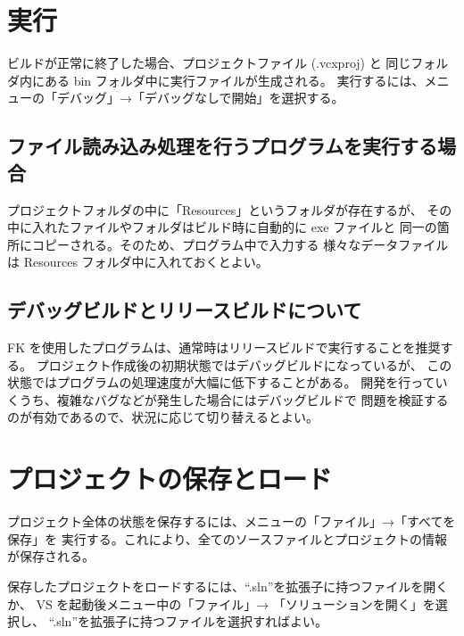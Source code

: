 \documentclass[a4j]{jarticle}
\begin{document}
\section{実行}
ビルドが正常に終了した場合、プロジェクトファイル (.vcxproj) と
同じフォルダ内にある bin フォルダ中に実行ファイルが生成される。
実行するには、メニューの「デバッグ」→「デバッグなしで開始」を選択する。

\subsection{ファイル読み込み処理を行うプログラムを実行する場合}
プロジェクトフォルダの中に「Resources」というフォルダが存在するが、
その中に入れたファイルやフォルダはビルド時に自動的に exe ファイルと
同一の箇所にコピーされる。そのため、プログラム中で入力する
様々なデータファイルは Resources フォルダ中に入れておくとよい。

\subsection{デバッグビルドとリリースビルドについて}
FK を使用したプログラムは、通常時はリリースビルドで実行することを推奨する。
プロジェクト作成後の初期状態ではデバッグビルドになっているが、
この状態ではプログラムの処理速度が大幅に低下することがある。
開発を行っていくうち、複雑なバグなどが発生した場合にはデバッグビルドで
問題を検証するのが有効であるので、状況に応じて切り替えるとよい。

\section{プロジェクトの保存とロード}
プロジェクト全体の状態を保存するには、メニューの「ファイル」→「すべてを保存」を
実行する。これにより、全てのソースファイルとプロジェクトの情報が保存される。

保存したプロジェクトをロードするには、``.sln''を拡張子に持つファイルを開くか、
VS を起動後メニュー中の「ファイル」→ 「ソリューションを開く」を選択し、
``.sln''を拡張子に持つファイルを選択すればよい。
\end{document}
